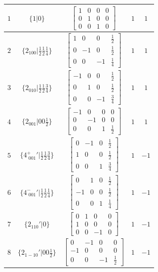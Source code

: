 \documentclass[fleqn,8pt]{jsarticle}
\begin{document}
\begin{longtable}{ccccc}
$ 1 $ & $ \{1|0\} $ & $ \begin{bmatrix} 1 & 0 & 0 & 0 \\ 0 & 1 & 0 & 0 \\ 0 & 0 & 1 & 0 \end{bmatrix} $ & $ 1 $ & $ 1 $ \\ \hline
$ 2 $ & $ \{2{}_{100}|\frac{1}{2} \frac{1}{2} \frac{1}{4}\} $ & $ \begin{bmatrix} 1 & 0 & 0 & \frac{1}{2} \\ 0 & -1 & 0 & \frac{1}{2} \\ 0 & 0 & -1 & \frac{1}{4} \end{bmatrix} $ & $ 1 $ & $ 1 $ \\ \hline
$ 3 $ & $ \{2{}_{010}|\frac{1}{2} \frac{1}{2} \frac{3}{4}\} $ & $ \begin{bmatrix} -1 & 0 & 0 & \frac{1}{2} \\ 0 & 1 & 0 & \frac{1}{2} \\ 0 & 0 & -1 & \frac{3}{4} \end{bmatrix} $ & $ 1 $ & $ 1 $ \\ \hline
$ 4 $ & $ \{2{}_{001}|0 0 \frac{1}{2}\} $ & $ \begin{bmatrix} -1 & 0 & 0 & 0 \\ 0 & -1 & 0 & 0 \\ 0 & 0 & 1 & \frac{1}{2} \end{bmatrix} $ & $ 1 $ & $ 1 $ \\ \hline
$ 5 $ & $ \{4^{+}_{\,\,001}{}'|\frac{1}{2} \frac{1}{2} \frac{3}{4}\} $ & $ \begin{bmatrix} 0 & -1 & 0 & \frac{1}{2} \\ 1 & 0 & 0 & \frac{1}{2} \\ 0 & 0 & 1 & \frac{3}{4} \end{bmatrix} $ & $ 1 $ & $ -1 $ \\ \hline
$ 6 $ & $ \{4^{-}_{\,\,001}{}'|\frac{1}{2} \frac{1}{2} \frac{1}{4}\} $ & $ \begin{bmatrix} 0 & 1 & 0 & \frac{1}{2} \\ -1 & 0 & 0 & \frac{1}{2} \\ 0 & 0 & 1 & \frac{1}{4} \end{bmatrix} $ & $ 1 $ & $ -1 $ \\ \hline
$ 7 $ & $ \{2{}_{110}{}'|0\} $ & $ \begin{bmatrix} 0 & 1 & 0 & 0 \\ 1 & 0 & 0 & 0 \\ 0 & 0 & -1 & 0 \end{bmatrix} $ & $ 1 $ & $ -1 $ \\ \hline
$ 8 $ & $ \{2{}_{1-10}{}'|0 0 \frac{1}{2}\} $ & $ \begin{bmatrix} 0 & -1 & 0 & 0 \\ -1 & 0 & 0 & 0 \\ 0 & 0 & -1 & \frac{1}{2} \end{bmatrix} $ & $ 1 $ & $ -1 $ \\
\end{longtable}
\end{document}
